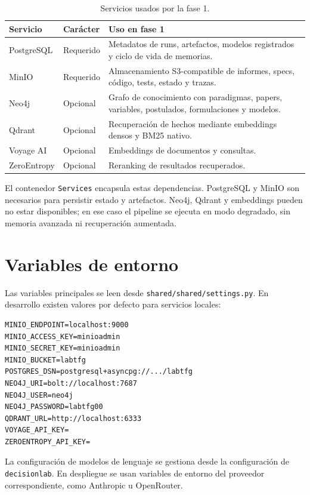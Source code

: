 \begin{table}[H]
\begin{center}
\small
\begin{tabular}{|p{3cm}|p{3cm}|p{6.3cm}|} \hline
\textbf{Servicio} & \textbf{Carácter} & \textbf{Uso en fase 1} \\ \hline
PostgreSQL & Requerido & Metadatos de runs, artefactos, modelos registrados y ciclo de vida de memorias. \\ \hline
MinIO & Requerido & Almacenamiento S3-compatible de informes, specs, código, tests, estado y trazas. \\ \hline
Neo4j & Opcional & Grafo de conocimiento con paradigmas, papers, variables, postulados, formulaciones y modelos. \\ \hline
Qdrant & Opcional & Recuperación de hechos mediante embeddings densos y BM25 nativo. \\ \hline
Voyage AI & Opcional & Embeddings de documentos y consultas. \\ \hline
ZeroEntropy & Opcional & Reranking de resultados recuperados. \\ \hline
\end{tabular}
\caption{Servicios usados por la fase 1.}
\end{center}
\end{table}

El contenedor \texttt{Services} encapsula estas dependencias. PostgreSQL y MinIO
son necesarios para persistir estado y artefactos. Neo4j, Qdrant y embeddings
pueden no estar disponibles; en ese caso el pipeline se ejecuta en modo
degradado, sin memoria avanzada ni recuperación aumentada.

\section{Variables de entorno}

Las variables principales se leen desde \texttt{shared/shared/settings.py}. En
desarrollo existen valores por defecto para servicios locales:

\begin{verbatim}
MINIO_ENDPOINT=localhost:9000
MINIO_ACCESS_KEY=minioadmin
MINIO_SECRET_KEY=minioadmin
MINIO_BUCKET=labtfg
POSTGRES_DSN=postgresql+asyncpg://.../labtfg
NEO4J_URI=bolt://localhost:7687
NEO4J_USER=neo4j
NEO4J_PASSWORD=labtfg00
QDRANT_URL=http://localhost:6333
VOYAGE_API_KEY=
ZEROENTROPY_API_KEY=
\end{verbatim}

La configuración de modelos de lenguaje se gestiona desde la configuración de
\texttt{decisionlab}. En despliegue se usan variables de entorno del proveedor
correspondiente, como Anthropic u OpenRouter.


